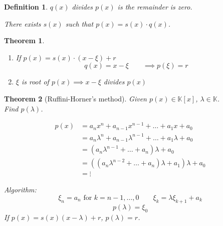 \documentclass{article}
\newtheorem{theorem}{Theorem}  \numberwithin{theorem}{section}
\newtheorem{definition}{Definition}  \numberwithin{definition}{section}
\begin{document}
\begin{definition} %
  $q(x)$ \emph{divides} $p(x)$ is the remainder is zero.

  There exists $s(x)$ such that $p(x) = s(x) \cdot q(x)$.
\end{definition}

\begin{theorem} %
  \begin{enumerate}
    \item If $p(x) = s(x) \cdot (x - \xi) + r$
      \[ q(x) = x - \xi \qquad \implies p(\xi) = r \]
    \item $\xi$ is root of $p(x) \implies x - \xi$ divides $p(x)$
  \end{enumerate}
\end{theorem}

\begin{theorem}[Ruffini-Horner's method]
  Given $p(x) \in \mathbb K[x]$, $\lambda \in \mathbb K$. \\
  Find $p(\lambda)$.

  \begin{align*}
    p(x) &= a_n x^n + a_{n-1} x^{n-1} + \dots + a_1 x + a_0 \\
      &= a_n \lambda^n + a_{n-1} \lambda^{n-1} + \ldots + a_1 \lambda + a_0 \\
      &= \left(a_n \lambda^{n-1} + \dots + a_n\right) \lambda + a_0 \\
      &= \left((a_n \lambda^{n-2} + \dots + a_n) \lambda + a_1\right) \lambda + a_0 \\
      &= \vdots
  \end{align*}

  Algorithm:
  \[ \xi_n = a_n \text{ for } k = n-1, \dots, 0 \qquad \xi_k = \lambda \xi_{k+1} + a_k \]
  \[ p(\lambda) = \xi_0 \]
  If $p(x) = s(x) (x - \lambda) + r$, $p(\lambda) = r$.
\end{theorem}
\end{document}
